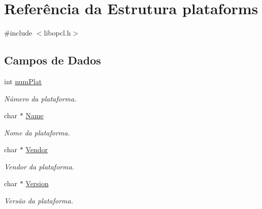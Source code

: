 \hypertarget{structplataforms}{}\section{Referência da Estrutura plataforms}
\label{structplataforms}


{\ttfamily \#include $<$libopcl.\+h$>$}

\subsection*{Campos de Dados}
\begin{DoxyCompactItemize}
\item 
\hypertarget{structplataforms_a8cc0a7307d1088b3be86bad8514a85a3}{}\label{structplataforms_a8cc0a7307d1088b3be86bad8514a85a3} 
int \hyperlink{structplataforms_a8cc0a7307d1088b3be86bad8514a85a3}{num\+Plat}
\begin{DoxyCompactList}\small\item\em Número da plataforma. \end{DoxyCompactList}\item 
\hypertarget{structplataforms_a5e6182c030324511dd82e9fa1a0ab071}{}\label{structplataforms_a5e6182c030324511dd82e9fa1a0ab071} 
char $\ast$ \hyperlink{structplataforms_a5e6182c030324511dd82e9fa1a0ab071}{Name}
\begin{DoxyCompactList}\small\item\em Nome da plataforma. \end{DoxyCompactList}\item 
\hypertarget{structplataforms_a3edc9ba9f59b30aa97a8d6d258caa80f}{}\label{structplataforms_a3edc9ba9f59b30aa97a8d6d258caa80f} 
char $\ast$ \hyperlink{structplataforms_a3edc9ba9f59b30aa97a8d6d258caa80f}{Vendor}
\begin{DoxyCompactList}\small\item\em Vendor da plataforma. \end{DoxyCompactList}\item 
\hypertarget{structplataforms_abc057f42fdaf5e63835a8272aefe278e}{}\label{structplataforms_abc057f42fdaf5e63835a8272aefe278e} 
char $\ast$ \hyperlink{structplataforms_abc057f42fdaf5e63835a8272aefe278e}{Version}
\begin{DoxyCompactList}\small\item\em Versão da plataforma. \end{DoxyCompactList}\item 
\hypertarget{structplataforms_a04797e250a09482a400749add9f8862e}{}\label{structplataforms_a04797e250a09482a400749add9f8862e} 

\end{DoxyCompactItemize}
